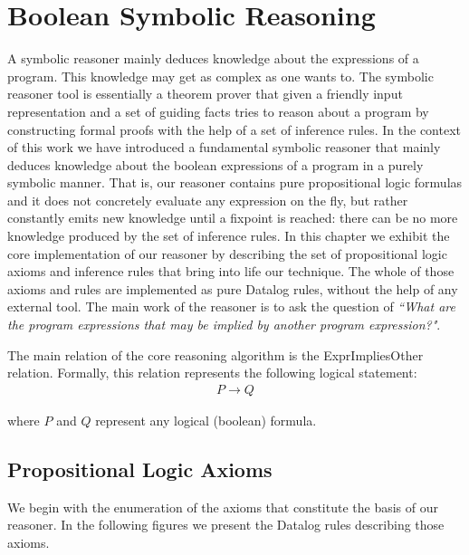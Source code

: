 \section{Boolean Symbolic Reasoning}\label{s:symbolic}

A symbolic reasoner mainly deduces knowledge about the expressions of a program. This knowledge may get
as complex as one wants to. The symbolic reasoner tool is essentially a theorem prover that given a
friendly input representation and a set of guiding facts tries to reason about a program
by constructing formal proofs with the help of a set of inference rules. In the context of this
work we have introduced a fundamental symbolic reasoner that mainly deduces knowledge about the
boolean expressions of a program in a purely symbolic manner. That is, our reasoner
contains pure propositional logic formulas and it
does not concretely evaluate any expression on the fly, but rather constantly emits
new knowledge until a fixpoint is reached: there can be no more knowledge produced by
the set of inference rules. In this chapter we exhibit the core implementation of our
reasoner by describing the set of propositional logic axioms and inference rules that
bring into life our technique. The whole of those axioms and rules are implemented as
pure Datalog rules, without the help of any external tool. The main work of the reasoner
is to ask the question of \emph{``What are the program expressions that may be implied by another program expression?"}.

The main relation of the core reasoning algorithm is the ExprImpliesOther relation. Formally,
this relation represents the following logical statement:\\

\begin{equation}
  \label{eq:implies}
  \begin{aligned}
    P \rightarrow Q
  \end{aligned}
\end{equation}

where $P$ and $Q$ represent any logical (boolean) formula.

\subsection{Propositional Logic Axioms}

We begin with the enumeration of the axioms that constitute the basis of our reasoner.
In the following figures we present the Datalog rules describing those axioms.

